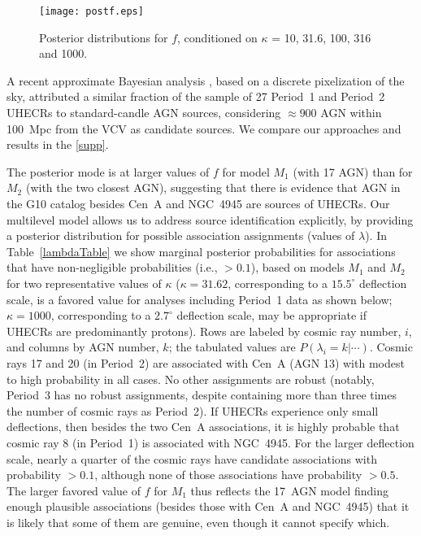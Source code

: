 \begin{figure}
\centerline{\texttt{[image: postf.eps]}}
\caption{Posterior distributions for $f$, conditioned on $\kappa$ = 10,
31.6, 100, 316 and 1000.}
\label{fig:postf}
\end{figure}

A recent approximate Bayesian analysis \cite{WMJ11-BayesUHECR}, based on a
discrete pixelization of the sky, attributed a similar fraction of the
sample of 27 Period~1 and Period~2 UHECRs to standard-candle AGN sources,
considering $\approx 900$ AGN within 100~Mpc from the VCV as candidate
sources.  We compare our approaches and results in the \ref{supp}.

The posterior mode is at larger values of $f$ for model $M_1$ (with 17 AGN)
than for $M_2$ (with the two closest AGN), suggesting that there is evidence
that AGN in the G10 catalog besides Cen~A and NGC~4945 are sources of
UHECRs.  Our multilevel model allows us to address source identification
explicitly, by providing a posterior distribution for possible association
assignments (values of $\lambda$).  In Table~\ref{lambdaTable} we show
marginal posterior probabilities for associations that have non-negligible
probabilities (i.e., $>0.1$), based on models $M_1$ and $M_2$ for two
representative values of $\kappa$ ($\kappa = 31.62$, corresponding to a
$15.5^\circ$ deflection scale, is a favored value for analyses including
Period~1 data as shown below; $\kappa=1000$, corresponding to a $2.7^\circ$
deflection scale, may be appropriate if UHECRs are predominantly protons). 
Rows are labeled by cosmic ray number, $i$, and columns by AGN number, $k$;
the tabulated values are $P(\lambda_i=k|\cdots)$.  Cosmic rays 17 and 20 (in
Period~2) are associated with Cen~A (AGN 13) with modest to high probability
in all cases.  No other assignments are robust (notably, Period~3 has no
robust assignments, despite containing more than three times the number of
cosmic rays as Period~2).  If UHECRs experience only small deflections, then
besides the two Cen~A associations, it is highly probable that cosmic ray 8
(in Period~1) is associated with NGC~4945.  For the larger deflection scale,
nearly a quarter of the cosmic rays have candidate associations with
probability $>0.1$, although none of those associations have probability
$>0.5$.
The larger favored value of $f$ for $M_1$ thus reflects the 17~AGN
model finding enough plausible associations (besides those with Cen~A and
NGC~4945) that it is likely that some of them are genuine, even though
it cannot specify which.

